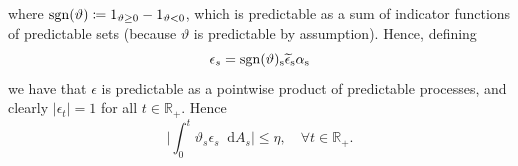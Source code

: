 \documentclass[11pt,a4paper,twoside,openany]{report}
\numberwithin{equation}{section}
\newcommand{\diff}{\mathop{}\!\mathrm{d}}
\theoremstyle{plain} %
\theoremstyle{definition} %
\theoremstyle{remark} %
\begin{document}
where \(\rm{sgn}(\vartheta)\coloneqq1_{\vartheta\geq 0}-1_{\vartheta<0}\), which is predictable as a sum of indicator functions of predictable sets (because \(\vartheta\) is predictable by assumption). 
Hence, defining
\begin{equation*}
    \epsilon_s = \rm{sgn}(\vartheta)_s\widetilde{\epsilon}_s\alpha_s
\end{equation*}
we have that \(\epsilon\) is predictable as a pointwise product of predictable processes, and clearly \(|\epsilon_t|=1\) for all \(t\in\mathbb{R}_+\). Hence 
\begin{equation*}
\bigg|\int_0^t\vartheta_s\epsilon_s\diff A_s\bigg|\leq\eta,\quad\forall t\in\mathbb{R}_+.
\end{equation*}
\end{document}
